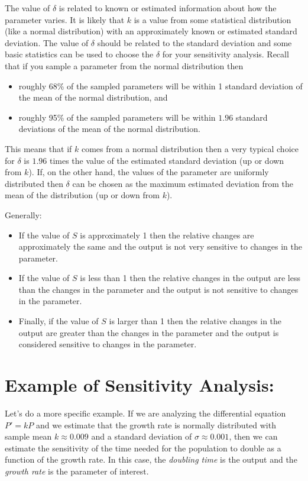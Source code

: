 The value of $\delta$ is related to known or estimated information about how the parameter
varies.  It is likely that $k$ is a value from some
statistical distribution (like a normal distribution) with an approximately known or
estimated standard deviation. The value of $\delta$ should be related to the standard
deviation and some basic statistics can be used to choose the $\delta$ for your
sensitivity analysis. Recall that if you sample a parameter from the normal distribution then
\begin{itemize}
    \item roughly 68\% of the sampled parameters will be within 1 standard deviation of
        the mean of the normal distribution, and 
    \item roughly 95\% of the sampled parameters will be within $1.96$ standard
        deviations of the mean of the normal distribution.
\end{itemize}
This means that if $k$ comes from a normal distribution then a very typical choice for
$\delta$ is $1.96$ times the value of the estimated standard deviation (up or down from
$k$).  If, on the other hand, the values of the parameter are uniformly distributed then
$\delta$ can be chosen as the maximum estimated deviation from the mean of the
distribution (up or down from $k$).  

Generally:
\begin{itemize}
    \item If the value of $S$ is approximately 1 then the relative changes are approximately the
        same and the output is not very sensitive to changes in the parameter.  
    \item If the value of $S$ is less than 1 then the relative changes in the output are
        less than the changes in the parameter and the output is not sensitive to changes
        in the parameter.  
    \item Finally, if the value of $S$ is larger than 1 then the relative changes in the
        output are greater than the changes in the parameter and the output is considered
        sensitive to changes in the parameter.
\end{itemize}

\section{Example of Sensitivity Analysis:}
Let's do a more specific example.  If we are analyzing the differential equation $P' = kP$
and we estimate that the growth rate is normally distributed with sample mean $k \approx
0.009$ and a standard deviation of $\sigma \approx 0.001$, then we can estimate the
sensitivity of the time needed for the population to double as a function of the growth
rate. In this case, the {\it doubling time} is the output and the {\it growth rate} is the
parameter of interest.

